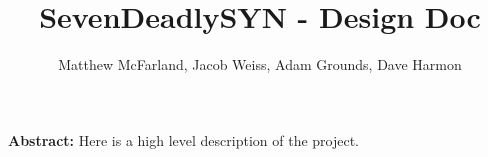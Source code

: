 \documentclass[12pt]{article}
\begin{document}
	
\title{SevenDeadlySYN - Design Doc}
\author{Matthew McFarland, Jacob Weiss, Adam Grounds, Dave Harmon}
\date{}
\maketitle
   
	\textbf{Abstract:} Here is a high level description of the project.
	
\tableofcontents

\pagebreak




\end{document}
